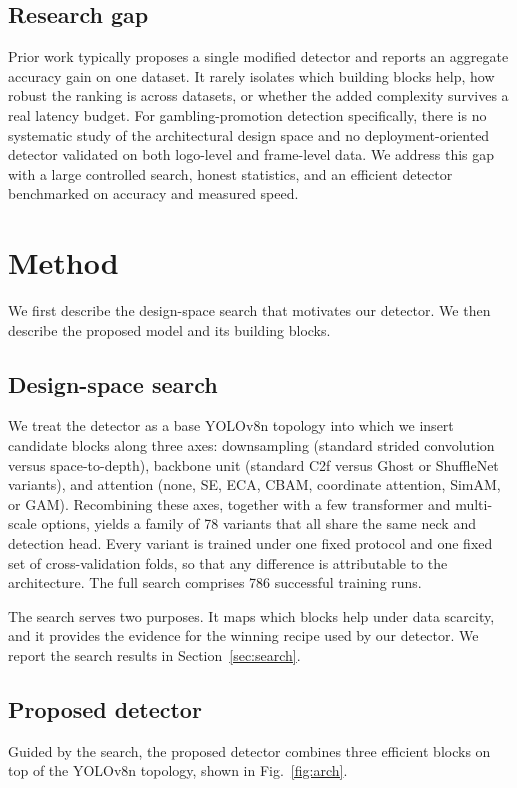 \documentclass[preprint,review,12pt]{elsarticle}
\begin{document}
\subsection{Research gap}
Prior work typically proposes a single modified detector and reports an aggregate
accuracy gain on one dataset. It rarely isolates which building blocks help, how
robust the ranking is across datasets, or whether the added complexity survives a
real latency budget. For gambling-promotion detection specifically, there is no
systematic study of the architectural design space and no deployment-oriented
detector validated on both logo-level and frame-level data. We address this gap
with a large controlled search, honest statistics, and an efficient detector
benchmarked on accuracy and measured speed.

\section{Method}
We first describe the design-space search that motivates our detector. We then
describe the proposed model and its building blocks.

\subsection{Design-space search}
We treat the detector as a base YOLOv8n topology into which we insert candidate
blocks along three axes: downsampling (standard strided convolution versus
space-to-depth), backbone unit (standard C2f versus Ghost or ShuffleNet
variants), and attention (none, SE, ECA, CBAM, coordinate attention, SimAM, or
GAM). Recombining these axes, together with a few transformer and multi-scale
options, yields a family of 78 variants that all share the same neck and
detection head. Every variant is trained under one fixed protocol and one fixed
set of cross-validation folds, so that any difference is attributable to the
architecture. The full search comprises 786 successful training runs.

The search serves two purposes. It maps which blocks help under data scarcity,
and it provides the evidence for the winning recipe used by our detector. We
report the search results in Section~\ref{sec:search}.

\subsection{Proposed detector}
Guided by the search, the proposed detector combines three efficient blocks on
top of the YOLOv8n topology, shown in Fig.~\ref{fig:arch}.
\end{document}
